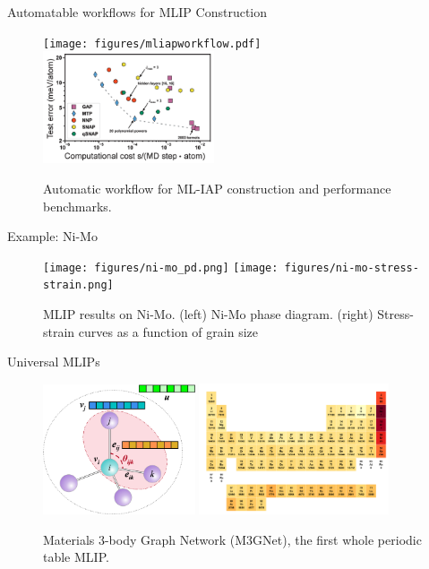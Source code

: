 \documentclass[aspectratio=169]{beamer}
\begin{document}
    \begin{frame}{Automatable workflows for MLIP Construction}
        \begin{figure}
            \centering
            \texttt{[image: figures/mliapworkflow.pdf]}
            \includegraphics[width=0.45\textwidth]{figures/mliapcostvsperformance.png}
            \caption{Automatic workflow for ML-IAP construction and performance benchmarks.\cite{zuoPerformanceCostAssessment2020}}
        \end{figure}
    \end{frame}


    \begin{frame}{Example: Ni-Mo}
        \begin{figure}
            \centering
            \texttt{[image: figures/ni-mo\_pd.png]}
            \texttt{[image: figures/ni-mo-stress-strain.png]}
            \caption{MLIP results on Ni-Mo. (left) Ni-Mo phase diagram. (right) Stress-strain curves as a function of grain size\cite{zuoPerformanceCostAssessment2020}}
        \end{figure}
    \end{frame}

    \begin{frame}{Universal MLIPs}
        \begin{figure}
            \centering
            \includegraphics[width=0.4\textwidth]{figures/m3gnet.png}
            \includegraphics[width=0.5\textwidth]{lectures/slides_tex/figures/matpes-pbe-pt.png}
            \caption{Materials 3-body Graph Network (M3GNet), the first whole periodic table MLIP.\cite{chenUniversalGraphDeep2022}}
        \end{figure}
    \end{frame}
\end{document}
